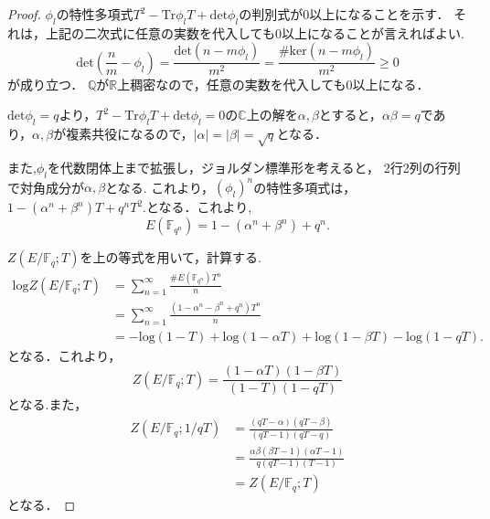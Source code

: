 \documentclass{ujarticle}
\begin{document}
\begin{proof}
 $\phi_l$の特性多項式$T^2 -\mathrm{Tr}\phi_l T+ \mathrm{det}\phi_l$の判別式が0以上になることを示す．
 それは，上記の二次式に任意の実数を代入しても0以上になることが言えればよい.
 \begin{equation*}
  \mathrm{det}(\frac{n}{m} - \phi_l)=\frac{\mathrm{det}(n -m \phi_l)}{m^2}
  = \frac{\#\mathrm{ker}(n -m \phi_l)}{m^2} \ge 0
 \end{equation*}
が成り立つ．
$\mathbb{Q}$が$\mathbb{R}$上稠密なので，任意の実数を代入しても0以上になる．

$\mathrm{det}\phi_l=q$より，$T^2 -\mathrm{Tr}\phi_l T+ \mathrm{det}\phi_l=0$の$\mathbb{C}$上の解を$\alpha,\beta$とすると，$\alpha \beta=q$であり，$\alpha,\beta$が複素共役になるので，$|\alpha|=|\beta|=\sqrt{q}$となる．

また,$\phi_l$を代数閉体上まで拡張し，ジョルダン標準形を考えると，
2行2列の行列で対角成分が$\alpha,\beta$となる.
これより，$(\phi_l)^n$の特性多項式は，$1-(\alpha^n + \beta^n)T +q^nT^2.$となる．これより,
\begin{equation*}
  E(\mathbb{F}_{q^n})=1-(\alpha^n + \beta^n) +q^n.
\end{equation*}

$Z(E/\mathbb{F}_q;T)$を上の等式を用いて，計算する.
\begin{align*}
  \mathrm{log}Z(E/\mathbb{F}_q;T) &= \sum_{n=1}^{\infty} \frac{\# E(\mathbb{F}_{q^n})T^n}{n} \\
  &= \sum_{n=1}^{\infty} \frac{(1 - \alpha^n -\beta^n + q^n)T^n}{n} \\
  &= -\mathrm{log}(1-T) + \mathrm{log}(1- \alpha T)+ \mathrm{log}(1- \beta T) - \mathrm{log}(1 -qT).
\end{align*}
となる．これより，
\begin{equation*}
 Z(E/\mathbb{F}_q;T)=\frac{(1- \alpha T)(1- \beta T)}{(1-T)(1-qT)}
\end{equation*}
となる.また，
\begin{align*}
  Z(E/\mathbb{F}_q;1/qT) &= \frac{(qT -\alpha)(qT -\beta)}{(q T - 1)(qT -q)} \\
  &= \frac{\alpha \beta(\beta T - 1)(\alpha T - 1)}{q(q T - 1)(T -1)}　\\
  &= Z(E/\mathbb{F}_q;T)
\end{align*}
となる．
\end{proof}
\end{document}
